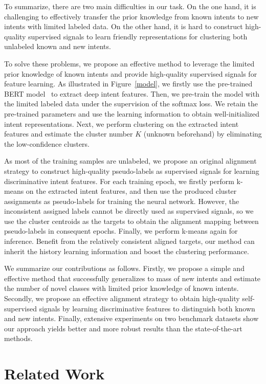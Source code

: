 \documentclass[letterpaper]{article} \usepackage{aaai21}  \usepackage{times}  \usepackage{helvet} \usepackage{courier}  \usepackage[hyphens]{url}  \usepackage{graphicx} \urlstyle{rm} \def\UrlFont{\rm}  \usepackage{natbib}  \usepackage{caption} \frenchspacing  \setlength{\pdfpagewidth}{8.5in}  \setlength{\pdfpageheight}{11in}  \usepackage{amsmath}
\begin{document}
	To summarize, there are two main difficulties in our task. On the one hand, it is challenging to effectively transfer the prior knowledge from known intents to new intents with limited labeled data. On the other hand, it is hard to construct high-quality supervised signals to learn friendly representations for clustering both unlabeled known and new intents.
	
	To solve these problems, we propose an effective method to leverage the limited prior knowledge of known intents and provide high-quality supervised signals for feature learning.  As illustrated in Figure~\ref{model}, we firstly use the pre-trained BERT model~\cite{devlin2018bert} to extract deep intent features. Then, we pre-train the model with the limited labeled data under the supervision of the softmax loss. We retain the pre-trained parameters and use the learning information to obtain well-initialized intent representations. Next, we perform clustering on the extracted intent features and estimate the cluster number $K$ (unknown beforehand) by eliminating the low-confidence clusters.
	
	As most of the training samples are unlabeled, we propose an original alignment strategy to construct high-quality pseudo-labels as supervised signals for learning discriminative intent features. For each training epoch, we firstly perform k-means on the extracted intent features, and then use the produced cluster assignments as pseudo-labels for training the neural network. However, the inconsistent assigned labels cannot be directly used as supervised signals, so we use the cluster centroids as the targets to obtain the alignment mapping between pseudo-labels in consequent epochs. Finally, we perform k-means again for inference. Benefit from the relatively consistent aligned targets, our method can inherit the history learning information and boost the clustering performance.
	
	We summarize our contributions as follows. Firstly, we propose a simple and effective method that successfully generalizes to mass of new intents and estimate the number of novel classes with limited prior knowledge of known intents. Secondly, we propose an effective alignment strategy to obtain high-quality self-supervised signals by learning discriminative features to distinguish both known and new intents. Finally, extensive experiments on two benchmark datasets show our approach yields better and more robust results than the state-of-the-art methods. 
	
	\section{Related Work}
\end{document}
